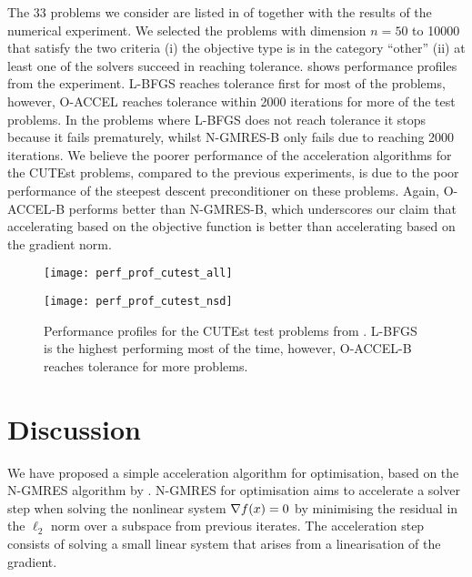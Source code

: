 \documentclass[main.tex]{subfiles}
\begin{document}
The \num{33} problems we consider are listed in
 of  together
with the results of the numerical experiment.  We selected the
problems with dimension $n=50$ to \num{10000} that satisfy the two
criteria (i) the objective type is in the category ``other'' (ii) at
least one of the solvers succeed in reaching tolerance.
 shows performance profiles from the
experiment. L-BFGS reaches tolerance first for most of the problems,
however, O-ACCEL reaches tolerance within \num{2000} iterations for
more of the test problems. In the problems where L-BFGS does not reach
tolerance it stops because it fails prematurely, whilst N-GMRES-B only
fails due to reaching \num{2000} iterations.  We believe the poorer
performance of the acceleration algorithms for the CUTEst problems,
compared to the previous experiments, is due to the poor performance
of the steepest descent preconditioner on these problems.  Again,
O-ACCEL-B performs better than N-GMRES-B, which underscores our claim
that accelerating based on the objective function is better than
accelerating based on the gradient norm.
\begin{figure}[htb]
  \centering
  \begin{minipage}{0.499\textwidth}
    \texttt{[image: perf\_prof\_cutest\_all]}
  \end{minipage}%
  \begin{minipage}{0.499\textwidth}
    \texttt{[image: perf\_prof\_cutest\_nsd]}
  \end{minipage}
  \caption{Performance profiles for the CUTEst test problems from
    .  L-BFGS is the highest
    performing most of the time, however, O-ACCEL-B reaches tolerance
    for more problems.}\label{fig:perf_prof_cutest}
\end{figure}

\section{Discussion}\label{sec:conclusion}
We have proposed a simple acceleration algorithm for optimisation,
based on the N-GMRES algorithm by
\citet{washio1997krylov,sterck2013steepest}.  N-GMRES for optimisation
aims to accelerate a solver step when solving the nonlinear system
$\nabla f(x)=0$ by minimising the residual in the $\ell_2$ norm over
a subspace from previous iterates.  The acceleration step consists of
solving a small linear system that arises from a linearisation of the
gradient.
\end{document}
